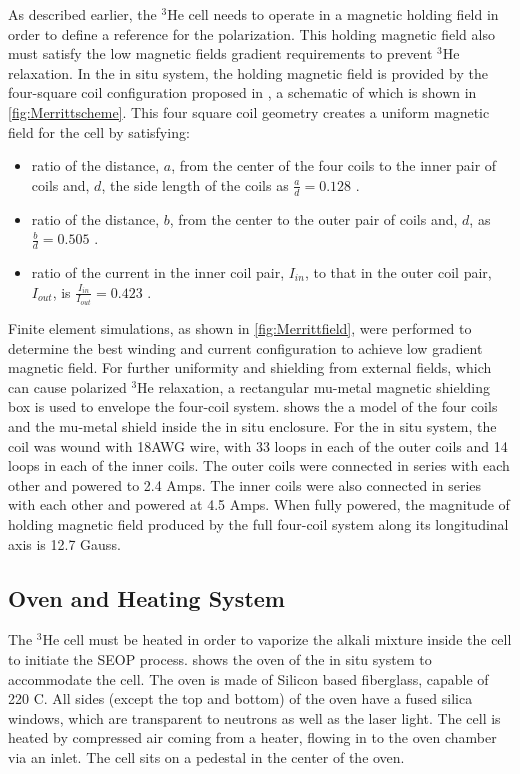 As described earlier, the $^3$He cell needs to operate in a magnetic holding field in order to define a reference for the polarization. This holding magnetic field also must satisfy the low magnetic fields gradient requirements to prevent $^3$He relaxation. In the in situ system, the holding magnetic field is provided by the four-square coil configuration proposed in \cite{Merritt1983}, a schematic of which is shown in \cref{fig:Merrittscheme}. This four square coil geometry creates a uniform magnetic field for the cell by satisfying:
\begin{itemize}
    \item ratio of the distance, $a$, from the center of the four coils to the inner pair of coils and, $d$, the side length of the coils as $\frac{a}{d} = 0.128$ \cite{Merritt1983}.
    \item ratio of the distance, $b$, from the center to the outer pair of coils and, $d$, as $\frac{b}{d} = 0.505$ \cite{Merritt1983}.
    \item ratio of the current in the inner coil pair, $I_{in}$, to that in the outer coil pair, $I_{out}$, is $\frac{I_{in}}{I_{out}} = 0.423$ \cite{Merritt1983}.
\end{itemize}  
Finite element simulations, as shown in \cref{fig:Merrittfield}, were performed to determine the best winding and current configuration to achieve low gradient magnetic field. For further uniformity and shielding from external fields, which can cause polarized $^3$He relaxation, a rectangular mu-metal magnetic shielding box is used to envelope the four-coil system.  shows the a model of the four coils and the mu-metal shield inside the in situ enclosure. For the in situ system, the coil was wound with 18AWG wire, with 33 loops in each of the outer coils and 14 loops in each of the inner coils. The outer coils were connected in series with each other and powered to 2.4 Amps. The inner coils were also connected in series with each other and powered at 4.5 Amps. When fully powered, the magnitude of holding magnetic field produced by the full four-coil system along its longitudinal axis is 12.7 Gauss.

\subsection{Oven and Heating System}

The $^3$He cell must be heated in order to vaporize the alkali mixture inside the cell to initiate the SEOP process.  shows the oven of the in situ system to accommodate the cell. The oven is made of Silicon based fiberglass, capable of 220 \degree C. All sides (except the top and bottom) of the oven have a fused silica windows, which are transparent to neutrons as well as the laser light. The cell is heated by compressed air coming from a heater, flowing in to the oven chamber via an inlet. The cell sits on a pedestal in the center of the oven.

